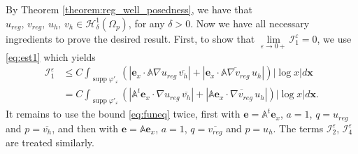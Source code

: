 \documentclass[report]{elsarticle}
\numberwithin{theorem}{section}
\renewcommand{\vec}[1]{\mathbf{#1}}
\newcommand{\re}{\varepsilon}
\begin{document}
	By Theorem \ref{theorem:reg_well_posedness}, we have that $u_{reg}, \, v_{reg}, \, u_h, \, v_h\in \mathcal{H}^1_{\delta}(\Omega_p)$, for any $\delta>0$. Now we have all necessary ingredients to prove the desired result. 
	First, to show that $\lim\limits_{\varepsilon\rightarrow 0+}\mathcal{I}_1^{\varepsilon}= 0$, we use \eqref{eq:est1} which yields  
	\begin{align*}
		\mathcal{I}_1^{\re}&\leq C \int_{\operatorname{supp}\varphi'_{\re}}\left(|\vec{e}_x\cdot \mathbb{A}\nabla u_{reg}\,\overline{ v_h}|+|\vec{e}_x\cdot \overline{\mathbb{A}\nabla v_{reg}}\, u_h|\right)|\log x|d\vec{x}\\
		&=C\int_{\operatorname{supp}\varphi'_{\re}}\left(| \mathbb{A}^t\vec{e}_x\cdot\nabla u_{reg}\,\overline{ v_h}|+|\mathbb{A}\vec{e}_x\cdot \overline{\nabla v_{reg}}\, u_h|\right)|\log x|d\vec{x}.
	\end{align*}
	It remains to use the bound \eqref{eq:funeq} twice, first with $\mathbf{e}=\mathbb{A}^t\mathbf{e}_x$, $a=1$, $q=u_{reg}$ and $p=\overline{v_h}$, and then with $\mathbf{e}=\mathbb{A}\mathbf{e}_x$, $a=1$, $q=\overline{v_{reg}}$ and $p=u_h$. The terms $\mathcal{I}_2^{\re}$, $\mathcal{I}_4^{\re}$ are treated similarly.
%	
\end{document}
